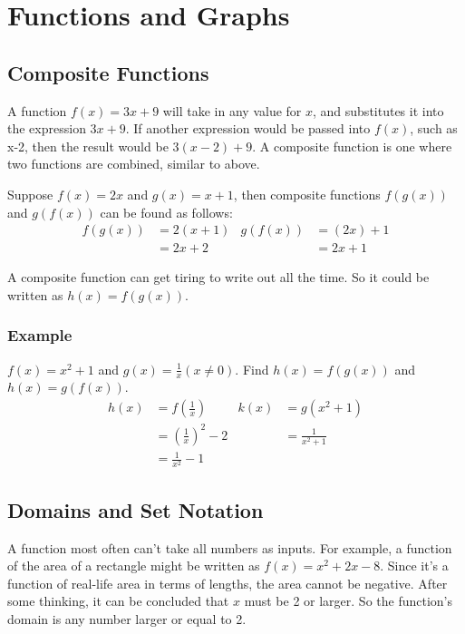 \newcommand{\N}{\mathbb{N}}
\newcommand{\Z}{\mathbb{Z}}
\newcommand{\Q}{\mathbb{Q}}
\newcommand{\R}{\mathbb{R}}
\newcommand{\C}{\mathbb{C}}

\chapter{Functions and Graphs}
\section{Composite Functions}
A function $f(x) = 3x+9$ will take in any value for $x$, and substitutes it into the expression $3x+9$. If another expression would be passed into $f(x)$, such as x-2, then the result would be $3(x-2)+9$. A composite function is one where two functions are combined, similar to above.

Suppose $f(x) = 2x$ and $g(x) = x+1$, then composite functions $f(g(x))$ and $g(f(x))$ can be found as follows:
\begin{align*}
	f(g(x)) &= 2(x+1) & g(f(x)) &= (2x)+1\\
	&=2x+2 & &=2x+1
\end{align*}

A composite function can get tiring to write out all the time. So it could be written as $h(x)=f(g(x))$.

\subsection{Example}
$f(x)=x^2+1$ and $g(x)=\frac{1}{x} \left(x\neq0\right)$. Find $h(x)=f(g(x))$ and $h(x)=g(f(x))$.
\begin{align*}
	h(x)&=f\left(\frac{1}{x}\right) & k(x)&=g\left(x^2+1\right)\\
	&=\left(\frac{1}{x}\right)^2-2 & &=\frac{1}{x^2+1}\\
	&=\frac{1}{x^2}-1
\end{align*}


\section{Domains and Set Notation}
A function most often can't take all numbers as inputs. For example, a function of the area of a rectangle might be written as $f(x)=x^2+2x-8$. Since it's a function of real-life area in terms of lengths, the area cannot be negative. After some thinking, it can be concluded that $x$ must be 2 or larger. So the function's domain is any number larger or equal to 2.

